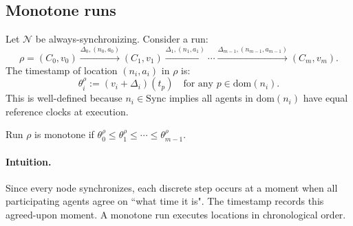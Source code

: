 \subsection{Monotone runs}

\begin{definition}
\label{def:timestamp}
Let $\mathcal{N}$ be always-synchronizing. Consider a run:
\[
\rho = (C_0, v_0) \xrightarrow{\Delta_0, (n_0, a_0)} (C_1, v_1) \xrightarrow{\Delta_1, (n_1, a_1)} \cdots \xrightarrow{\Delta_{m-1}, (n_{m-1}, a_{m-1})} (C_m, v_m).
\]
The \textsf{timestamp} of location $(n_i, a_i)$ in $\rho$ is:
\[
\theta^\rho_i := (v_i + \Delta_i)(t_p) \quad \text{for any } p \in \text{dom}(n_i).
\]
This is well-defined because $n_i \in \text{Sync}$ implies all agents in $\text{dom}(n_i)$ have equal reference clocks at execution.

Run $\rho$ is \textsf{monotone} if $\theta^\rho_0 \leq \theta^\rho_1 \leq \cdots \leq \theta^\rho_{m-1}$.
\end{definition}

\paragraph{Intuition.} Since every node synchronizes, each discrete step occurs at a moment when all participating agents agree on ``what time it is". The timestamp records this agreed-upon moment. A monotone run executes locations in chronological order.


